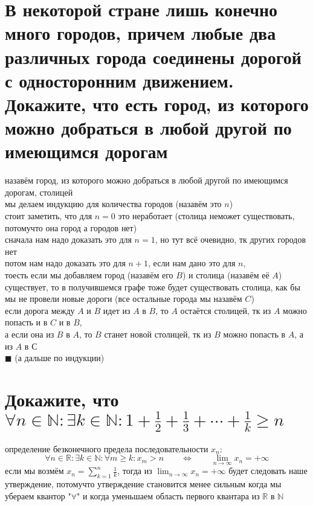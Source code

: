 \documentclass{article}
\newcommand{\ds}{\displaystyle}
\begin{document}
  \section{В некоторой стране лишь конечно много городов, причем любые два различных города соединены дорогой с односторонним движением. Докажите, что есть город, из которого можно добраться в любой другой по имеющимся дорогам}
  назавём город, из которого можно добраться в любой другой по имеющимся дорогам, столицей \\
  мы делаем индукцию для количества городов (назавём это $n$) \\
  стоит заметить, что для $n=0$ это неработает (столица неможет существовать, потомучто она город а городов нет) \\
  сначала нам надо доказать это для $n=1$, но тут всё очевидно, тк других городов нет \\
  потом нам надо доказать это для $n+1$, если нам дано это для $n$, \\
  тоесть если мы добавляем город (назавём его $B$) и столица (назавём её $A$) существует,
  то в получившемся графе тоже будет существовать столица, как бы мы не провели новые дороги (все остальные города мы назавём $C$) \\
  если дорога между $A$ и $B$ идет из $A$ в $B$, то $A$ остаётся столицей, тк из $A$ можно попасть и в $C$ и в $B$, \\
  а если она из $B$ в $A$, то $B$ станет новой столицей, тк из $B$ можно попасть в $A$, а из $A$ в $С$ \\
  $\blacksquare$ (а дальше по индукции)

  \section{Докажите, что $\forall n\in\mathbb{N}:\exists k\in\mathbb{N}: 1+\frac{1}{2}+\frac{1}{3}+\cdots+\frac{1}{k} \geq n$}
  определение безконечного предела последовательности $x_n$:
  \[
    \forall n\in\mathbb{R}:\exists k\in\mathbb{N}:\forall m \geq k: x_m > n
    \qquad\iff\qquad
    \lim_{n \to \infty} x_n = +\infty
  \]
  если мы возмём $\ds x_n = \sum_{k=1}^n \frac{1}{k}$, тогда из $\ds \lim_{n \to \infty} x_n = +\infty $ будет следовать наше утверждение,
  потомучто утверждение становится менее сильным когда мы убераем квантор "$\forall$"{} и когда уменьшаем область первого квантара из $\mathbb{R}$ в $\mathbb{N}$
\end{document}
